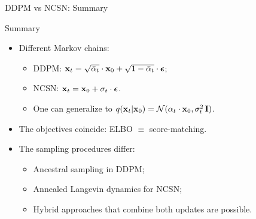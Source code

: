 \documentclass{beamer}
\renewcommand{\eqpause}{}
\begin{document}
\begin{frame}{DDPM vs NCSN: Summary}
	\begin{block}{Summary}
		\begin{itemize}
		\item Different Markov chains:
			\begin{itemize}
				\item DDPM: $\mathbf{x}_t = \sqrt{\bar{\alpha}_t} \cdot \mathbf{x}_0 + \sqrt{1 - \bar{\alpha}_t} \cdot \boldsymbol{\epsilon}$;
				\item NCSN: $\mathbf{x}_t = \mathbf{x}_0 + \sigma_t \cdot \boldsymbol{\epsilon}$.
				\item One can generalize to $q(\mathbf{x}_t |\mathbf{x}_0) = \mathcal{N}(\alpha_t \cdot \mathbf{x}_0, \sigma^2_t\, \mathbf{I})$.
			\end{itemize}
		\eqpause
		\item The objectives coincide: ELBO $\equiv$ score-matching.
		\eqpause
		\item The sampling procedures differ:
			\begin{itemize}
				\item Ancestral sampling in DDPM;
				\item Annealed Langevin dynamics for NCSN;
				\item Hybrid approaches that combine both updates are possible.
			\end{itemize}
		\end{itemize}
	\end{block}
\end{frame}
\end{document}
